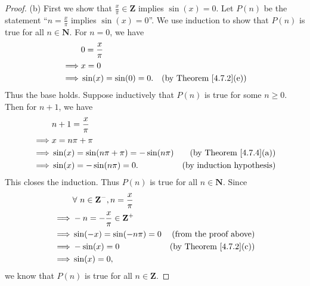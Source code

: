\begin{proof}{(b)}
    First we show that \(\frac{x}{\pi} \in \mathbf{Z}\) implies \(\sin(x) = 0\).
    Let \(P(n)\) be the statement ``\(n = \frac{x}{\pi}\) implies \(\sin(x) = 0\)''.
    We use induction to show that \(P(n)\) is true for all \(n \in \mathbf{N}\).
    For \(n = 0\), we have
    \begin{align*}
                 & 0 = \frac{x}{\pi}                                           \\
        \implies & x = 0                                                       \\
        \implies & \sin(x) = \sin(0) = 0. & \text{(by Theorem \ref{4.7.2}(e))}
    \end{align*}
    Thus the base holds.
    Suppose inductively that \(P(n)\) is true for some \(n \geq 0\).
    Then for \(n + 1\), we have
    \begin{align*}
                 & n + 1 = \frac{x}{\pi}                                                           \\
        \implies & x = n \pi + \pi                                                                 \\
        \implies & \sin(x) = \sin(n \pi + \pi) = -\sin(n \pi) & \text{(by Theorem \ref{4.7.4}(a))} \\
        \implies & \sin(x) = -\sin(n \pi) = 0.                & \text{(by induction hypothesis)}
    \end{align*}
    This closes the induction.
    Thus \(P(n)\) is true for all \(n \in \mathbf{N}\).
    Since
    \begin{align*}
                 & \forall\ n \in \mathbf{Z}^-, n = \frac{x}{\pi}                                      \\
        \implies & -n = -\frac{x}{\pi} \in \mathbf{Z}^+                                                \\
        \implies & \sin(-x) = \sin(- n \pi) = 0                   & \text{(from the proof above)}      \\
        \implies & -\sin(x) = 0                                   & \text{(by Theorem \ref{4.7.2}(c))} \\
        \implies & \sin(x) = 0,
    \end{align*}
    we know that \(P(n)\) is true for all \(n \in \mathbf{Z}\).


\end{proof}
